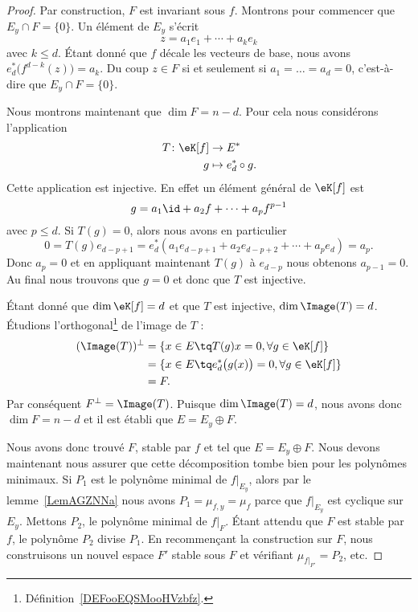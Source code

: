 \begin{proof}
	Par construction, \( F\) est invariant sous \( f\). Montrons pour commencer que \( E_y\cap F=\{ 0 \}\). Un élément de \( E_y\) s'écrit
	\begin{equation}
		z=a_1e_1+\cdots +a_ke_k
	\end{equation}
	avec \( k\leq d\). Étant donné que \( f\) décale les vecteurs de base, nous avons \( e^*_d\big( f^{d-k}(z) \big)=a_k\). Du coup \( z\in F\) si et seulement si \( a_1=\ldots=a_d=0\), c'est-à-dire que \( E_y\cap F=\{ 0 \}\).

	Nous montrons maintenant que \( \dim F=n-d\). Pour cela nous considérons l'application
	\begin{equation}
		\begin{aligned}
			T\colon \eK[f] & \to E^*               \\
			g              & \mapsto e^*_d\circ g.
		\end{aligned}
	\end{equation}
	Cette application est injective. En effet un élément général de \( \eK[f]\) est
	\begin{equation}
		g=a_1\id+a_2f+\cdots +a_pf^{p-1}
	\end{equation}
	avec \( p\leq d\). Si \( T(g)=0\), alors nous avons en particulier
	\begin{equation}
		0=T(g)e_{d-p+1}=e^*_d(a_1e_{d-p+1}+a_2e_{d-p+2}+\cdots +a_pe_d)=a_p.
	\end{equation}
	Donc \( a_p=0\) et en appliquant maintenant \( T(g)\) à \( e_{d-p}\) nous obtenons \( a_{p-1}=0\). Au final nous trouvons que \( g=0\) et donc que \( T\) est injective.

	Étant donné que \( \dim\eK[f]=d\) et que \( T\) est injective, \( \dim\Image(T)=d\). Étudions l'orthogonal\footnote{Définition~\ref{DEFooEQSMooHVzbfz}.} de l'image de \( T\) :
	\begin{subequations}
		\begin{align}
			(\Image(T))^{\perp} & =\{ x\in E\tq T(g)x=0, \forall g\in \eK[f] \}                     \\
			                    & =\{ x\in E\tq e^*_d\big( g(x) \big)=0,     \forall g\in \eK[f] \} \\
			                    & =F.
		\end{align}
	\end{subequations}
	Par conséquent \( F^{\perp}=\Image(T)\). Puisque \( \dim\Image(T)=d\), nous avons donc \( \dim F=n-d\) et il est établi que \( E=E_y\oplus F\).

	Nous avons donc trouvé \( F\), stable par \( f\) et tel que \( E=E_y\oplus F\). Nous devons maintenant nous assurer que cette décomposition tombe bien pour les polynômes minimaux. Si \( P_1\) est le polynôme minimal de \( f|_{E_y}\), alors par le lemme~\ref{LemAGZNNa} nous avons \( P_1=\mu_{f,y}=\mu_f\) parce que \( f|_{E_y}\) est cyclique sur \( E_y\). Mettons \( P_2\), le polynôme minimal de \( f|_F\). Étant attendu que \( F\) est stable par \( f\), le polynôme \( P_2\) divise \( P_1\). En recommençant la construction sur \( F\), nous construisons un nouvel espace \( F'\) stable sous \( F\) et vérifiant \( \mu_{f|_{F'}}=P_2\), etc.


\end{proof}
